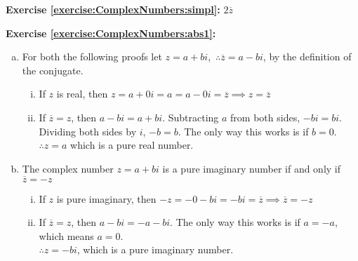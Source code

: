 \noindent\textbf{Exercise \ref{exercise:ComplexNumbers:simpl}:}
$2\overline{z}$

\noindent\textbf{Exercise \ref{exercise:ComplexNumbers:abs1}:}  %
\begin{enumerate}[(a)]
\item
For both the following proofs let $z = a + bi$,\ $\therefore \overline{z} = a - bi$, by the definition of the conjugate.
        \begin{enumerate}[i.]
            \item 
            If $z$ is real, then $z = a + 0i = a = a - 0i = \overline{z}\implies z = \overline{z}$
            \item 
            If $\overline{z} = z$, then $a - bi = a + bi$. Subtracting $a$ from both sides, $-bi = bi$. Dividing both sides by $i$, $-b = b$. The only way this works is if $b=0$.\\
            $\therefore z=a$ which is a pure real number.
        \end{enumerate}
 
\item
The complex number $z = a + bi$ is a pure imaginary number if and only if $\overline{z} = -z$
        \begin{enumerate}[i.]
            \item
            If $z$ is pure imaginary, then $-z = -0 - bi = - bi = \overline{z}\implies \overline{z} = -z$
            \item
             If $\overline{z} = z$, then $a - bi = -a - bi$. The only way this works is if $a = -a$, which means $a=0$.\\
            $\therefore z = -bi$, which is a pure imaginary number.
        \end{enumerate}
\end{enumerate}
 
